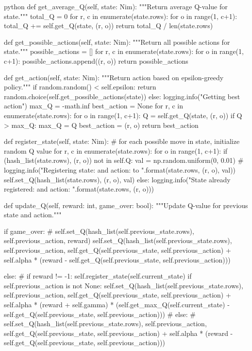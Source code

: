 \begin{mintedbox}{python}
def get_average_Q(self, state: Nim):
    """Return average Q-value for state."""
    total_Q = 0
    for r, c in enumerate(state.rows):
        for o in range(1, c+1):
            total_Q += self.get_Q(state, (r, o))
    return total_Q / len(state.rows)

def get_possible_actions(self, state: Nim):
    """Return all possible actions for state."""
    possible_actions = []
    for r, c in enumerate(state.rows):
        for o in range(1, c+1):
            possible_actions.append((r, o))
    return possible_actions

def get_action(self, state: Nim):
    """Return action based on epsilon-greedy policy."""
    if random.random() < self.epsilon:
        return random.choice(self.get_possible_actions(state))
    else:
        logging.info("Getting best action")
        max_Q = -math.inf
        best_action = None
        for r, c in enumerate(state.rows):
            for o in range(1, c+1):
                Q = self.get_Q(state, (r, o))
                if Q > max_Q:
                    max_Q = Q
                    best_action = (r, o)
        return best_action

def register_state(self, state: Nim):
    # for each possible move in state, initialize random Q value
    for r, c in enumerate(state.rows):
        for o in range(1, c+1):
            if (hash_list(state.rows), (r, o)) not in self.Q:
                val = np.random.uniform(0, 0.01)
                # logging.info("Registering state: {} and action: {} to {}".format(state.rows, (r, o), val))
                self.set_Q(hash_list(state.rows), (r, o), val)
            else:
                logging.info("State already registered: {} and action: {}".format(state.rows, (r, o)))

def update_Q(self, reward: int, game_over: bool):
    """Update Q-value for previous state and action."""

    if game_over:
        # self.set_Q(hash_list(self.previous_state.rows), self.previous_action, reward)
        self.set_Q(hash_list(self.previous_state.rows), self.previous_action, self.get_Q(self.previous_state, self.previous_action) + self.alpha * (reward - self.get_Q(self.previous_state, self.previous_action)))

    else:
    # if reward != -1:
        self.register_state(self.current_state)
        if self.previous_action is not None:
            self.set_Q(hash_list(self.previous_state.rows), self.previous_action, self.get_Q(self.previous_state, self.previous_action) +
                        self.alpha * (reward + self.gamma) * (self.get_max_Q(self.current_state) - self.get_Q(self.previous_state, self.previous_action)))
    # else:
    #     self.set_Q(hash_list(self.previous_state.rows), self.previous_action, self.get_Q(self.previous_state, self.previous_action) + self.alpha * (reward - self.get_Q(self.previous_state, self.previous_action)))


\end{mintedbox}
